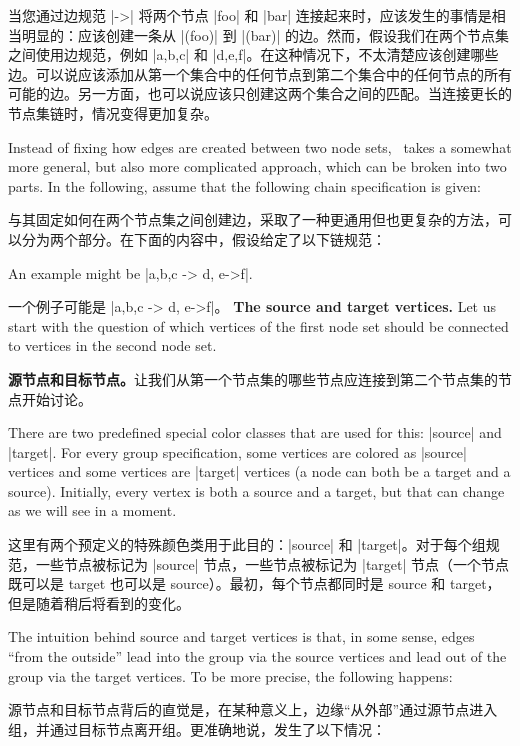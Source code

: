 当您通过边规范 |->| 将两个节点 |foo| 和 |bar| 连接起来时，应该发生的事情是相当明显的：应该创建一条从 |(foo)| 到 |(bar)| 的边。然而，假设我们在两个节点集之间使用边规范，例如 |{a,b,c}| 和 |{d,e,f}|。在这种情况下，不太清楚应该创建哪些边。可以说应该添加从第一个集合中的任何节点到第二个集合中的任何节点的所有可能的边。另一方面，也可以说应该只创建这两个集合之间的匹配。当连接更长的节点集链时，情况变得更加复杂。

Instead of fixing how edges are created between two node sets, \tikzname\ takes
a somewhat more general, but also more complicated approach, which can be
broken into two parts. In the following, assume that the following chain
specification is given:

与其固定如何在两个节点集之间创建边，\tikzname 采取了一种更通用但也更复杂的方法，可以分为两个部分。在下面的内容中，假设给定了以下链规范：
%
\begin{quote}
      
\end{quote}
%
An example might be |{a,b,c} -> {d, e->f}|.

一个例子可能是 |{a,b,c} -> {d, e->f}|。
\medskip
\textbf{The source and target vertices.} Let us start with the question of
which vertices of the first node set should be connected to vertices in the
second node set.

\textbf{源节点和目标节点。}让我们从第一个节点集的哪些节点应连接到第二个节点集的节点开始讨论。

There are two predefined special color classes that are used for this: |source|
and |target|. For every group specification, some vertices are colored as
|source| vertices and some vertices are |target| vertices (a node can both be a
target and a source). Initially, every vertex is both a source and a target,
but that can change as we will see in a moment.

这里有两个预定义的特殊颜色类用于此目的：|source| 和 |target|。对于每个组规范，一些节点被标记为 |source| 节点，一些节点被标记为 |target| 节点（一个节点既可以是 target 也可以是 source）。最初，每个节点都同时是 source 和 target，但是随着稍后将看到的变化。

The intuition behind source and target vertices is that, in some sense, edges
``from the outside'' lead into the group via the source vertices and lead out
of the group via the target vertices. To be more precise, the following
happens:

源节点和目标节点背后的直觉是，在某种意义上，边缘``从外部''通过源节点进入组，并通过目标节点离开组。更准确地说，发生了以下情况：

